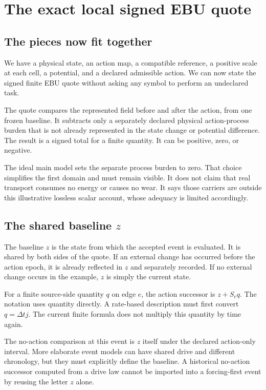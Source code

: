 \chapter{The exact local signed EBU quote}\label{ch:quote}

\section{The pieces now fit together}
We have a physical state, an action map, a compatible reference, a positive scale at each cell, a potential, and a declared admissible action. We can now state the signed finite EBU quote without asking any symbol to perform an undeclared task.

The quote compares the represented field before and after the action, from one frozen baseline. It subtracts only a separately declared physical action-process burden that is not already represented in the state change or potential difference. The result is a signed total for a finite quantity. It can be positive, zero, or negative.

The ideal main model sets the separate process burden to zero. That choice simplifies the first domain and must remain visible. It does not claim that real transport consumes no energy or causes no wear. It says those carriers are outside this illustrative lossless scalar account, whose adequacy is limited accordingly.

\section{The shared baseline \(z\)}
The baseline \(z\) is the state from which the accepted event is evaluated. It is shared by both sides of the quote. If an external change has occurred before the action epoch, it is already reflected in \(z\) and separately recorded. If no external change occurs in the example, \(z\) is simply the current state.

For a finite source-side quantity \(q\) on edge \(e\), the action successor is \(z+S_e q\). The notation uses quantity directly. A rate-based description must first convert \(q=\Delta t j\). The current finite formula does not multiply this quantity by time again.

The no-action comparison at this event is \(z\) itself under the declared action-only interval. More elaborate event models can have shared drive and different chronology, but they must explicitly define the baseline. A historical no-action successor computed from a drive law cannot be imported into a forcing-first event by reusing the letter \(z\) alone.

